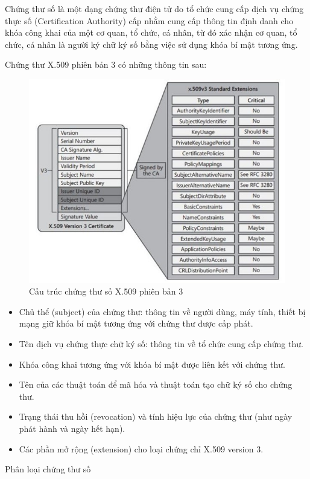 Chứng thư số là một dạng chứng thư điện tử do tổ chức cung cấp dịch vụ chứng thực số (Certification Authority) cấp nhằm cung cấp thông tin định danh cho khóa công khai của một cơ quan, tổ chức, cá nhân, từ đó xác nhận cơ quan, tổ chức, cá nhân là người ký chữ ký số bằng việc sử dụng khóa bí mật tương ứng. 

Chứng thư X.509 phiên bản 3 có những thông tin sau:
\begin{figure}[H]
\centering
\includegraphics[width=.9\linewidth]{img/x509v3.jpg}
\caption{Cấu trúc chứng thư số X.509 phiên bản 3}
\end{figure}
\begin{itemize}

\item Chủ thể (subject) của chứng thư: thông tin về người dùng, máy tính, thiết bị mạng giữ khóa bí mật tương ứng với chứng thư được cấp phát.
\item Tên dịch vụ chứng thực chữ ký số: thông tin về tổ chức cung cấp chứng thư.
\item Khóa công khai tương ứng với khóa bí mật được liên kết với chứng thư.
\item Tên của các thuật toán để mã hóa và thuật toán tạo chữ ký số cho chứng thư.
\item Trạng thái thu hồi (revocation) và tính hiệu lực của chứng thư (như ngày phát hành và ngày hết hạn).
\item Các phần mở rộng (extension) cho loại chứng chỉ X.509 version 3.

\end{itemize}

Phân loại chứng thư số


